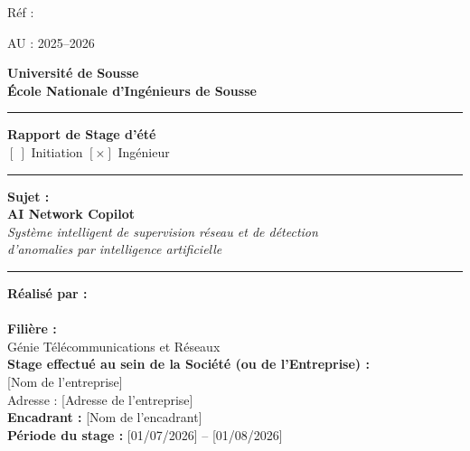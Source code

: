 \documentclass[12pt,a4paper]{report}
\begin{document}
\begin{titlepage}
\thispagestyle{empty}
\begin{flushright}
\small Réf : \dotfill
\end{flushright}
\begin{flushright}
\small AU : 2025--2026
\end{flushright}

\vspace{0.4cm}
\begin{center}
{\large\textbf{Université de Sousse}}\\[0.2cm]
{\large\textbf{École Nationale d'Ingénieurs de Sousse}}\\[0.6cm]

\rule{\textwidth}{1pt}
\vspace{0.8cm}

{\Huge\bfseries\color{bleutt} Rapport de Stage d'été}\\[0.6cm]
{\large $[\ ]$ Initiation \qquad $[\times]$ Ingénieur}\\[1.2cm]

\rule{0.6\textwidth}{0.6pt}
\vspace{1cm}

{\large\bfseries Sujet :}\\[0.3cm]
{\LARGE\bfseries\color{bleutt} AI Network Copilot}\\[0.4cm]
{\large\itshape Système intelligent de supervision réseau et de détection\\ d'anomalies par intelligence artificielle}\\[1.4cm]

\rule{0.6\textwidth}{0.6pt}
\vspace{0.8cm}

\begin{minipage}{0.9\textwidth}
\centering
\large
\textbf{Réalisé par :}\\
[Nom et Prénom de l'étudiant(e)]\\[0.5cm]

\textbf{Filière :}\\
Génie Télécommunications et Réseaux\\[0.5cm]

\textbf{Stage effectué au sein de la Société (ou de l'Entreprise) :}\\
{[Nom de l'entreprise]}\\
Adresse : [Adresse de l'entreprise]\\[0.5cm]

\textbf{Encadrant :} [Nom de l'encadrant]\\[0.5cm]

\textbf{Période du stage :} [01/07/2026] -- [01/08/2026]
\end{minipage}

\end{center}
\end{titlepage}
\end{document}
